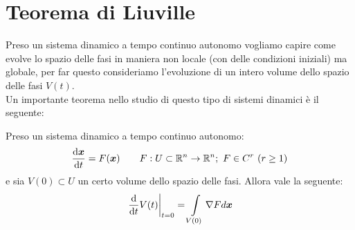 \section{Teorema di Liuville}%
\label{sub:Teorema di Liuville}
Preso un sistema dinamico a tempo continuo autonomo vogliamo capire come evolve lo spazio delle fasi in maniera non locale (con delle condizioni iniziali) ma globale, per far questo consideriamo l'evoluzione di un intero volume dello spazio delle fasi $V(t)$.\\
Un importante teorema nello studio di questo tipo di sistemi dinamici è il seguente:
\begin{thm}
    Preso un sistema dinamico a tempo continuo autonomo:
\[
    \frac{\text{d} \boldsymbol{x}}{\text{d} t} = F(\boldsymbol{x})
\qquad 
F: U \subset \mathbb{R}^n\to \mathbb{R}^n; \ F \in C^r \ (r\ge 1)
\] 
e sia $V(0) \subset U$ un certo volume dello spazio delle fasi. Allora vale la seguente:
\begin{equation}
    \left.\frac{\text{d}}{\text{d} t} V(t)\right|_{t=0} = \int\limits_{V(0)} \nabla F d\boldsymbol{x}
	\label{eq:9_1}
\end{equation}
\end{thm}
\noindent
